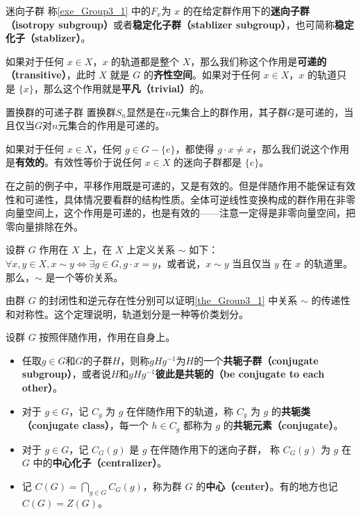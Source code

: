 \begin{definition}{迷向子群}
称\autoref{exe_Group3_1} 中的$F_x$为 $x$ 的在给定群作用下的\textbf{迷向子群（isotropy subgroup）}或者\textbf{稳定化子群（stablizer subgroup）}，也可简称\textbf{稳定化子（stablizer）}。
\end{definition}






\begin{definition}{}
如果对于任何 $x\in X$，$x$ 的轨道都是整个 $X$，那么我们称这个作用是\textbf{可递的（transitive）}，此时 $X$ 就是 $G$ 的\textbf{齐性空间}。如果对于任何 $x\in X$，$x$ 的轨道只是 $\{x\}$，那么这个作用就是\textbf{平凡（trivial）}的。
\end{definition}

\begin{example}{置换群的可递子群}\label{ex_Group3_4}
置换群$S_n$显然是在$n$元集合上的群作用，其子群$G$是可递的，当且仅当$G$对$n$元集合的作用是可递的。
\end{example}

如果对于任何 $x\in X$，任何 $g\in G-\{e\}$，都使得 $g\cdot x\not=x$，那么我们说这个作用是\textbf{有效的}。有效性等价于说任何 $x\in X$ 的迷向子群都是 $\{e\}$。

在之前的例子中，平移作用既是可递的，又是有效的。但是伴随作用不能保证有效性和可递性，具体情况要看群的结构性质。全体可逆线性变换构成的群作用在非零向量空间上，这个作用是可递的，也是有效的——注意一定得是非零向量空间，把零向量排除在外。

\begin{theorem}{}\label{the_Group3_1}
设群 $G$ 作用在 $X$ 上，在 $X$ 上定义关系 $\sim$ 如下：$\forall x, y\in X, x\sim y \iff \exists g\in G, g\cdot x=y$，或者说，$x\sim y$ 当且仅当 $y$ 在 $x$ 的轨道里。那么，$\sim$ 是一个等价关系。
\end{theorem}

由群 $G$ 的封闭性和逆元存在性分别可以证明\autoref{the_Group3_1} 中关系 $\sim$ 的传递性和对称性。这个定理说明，轨道划分是一种等价类划分。






\begin{definition}{}
设群 $G$ 按照伴随作用，作用在自身上。
\begin{itemize}
\item 任取$g\in G$和$G$的子群$H$，则称$gHg^{-1}$为$H$的一个\textbf{共轭子群（conjugate subgroup）}，或者说$H$和$gHg^{-1}$\textbf{彼此是共轭的（be conjugate to each other）}。
\item 对于 $g\in G$，记 $C_g$ 为 $g$ 在伴随作用下的轨道，称 $C_g$ 为 $g$ 的\textbf{共轭类（conjugate class）}，每一个 $h\in C_g$ 都称为 $g$ 的\textbf{共轭元素（conjugate）}。

\item 对于 $g\in G$，记 $C_G(g)$ 是 $g$ 在伴随作用下的迷向子群， 称 $C_G(g)$ 为 $g$ 在 $G$ 中的\textbf{中心化子（centralizer）}。

\item 记 $C(G)=\bigcap_{g\in G} C_G(g)$，称为群 $G$ 的\textbf{中心（center）}。有的地方也记$C(G)=Z(G)$。
\end{itemize}
\end{definition}

